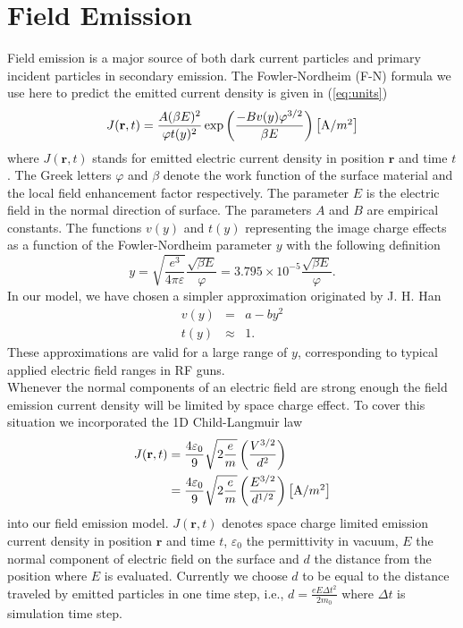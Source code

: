 \chapter{Field Emission}
\label{chp:femiss}
Field emission is a major source of both dark current particles and primary
incident particles in secondary emission. The Fowler-Nordheim (F-N) formula
we use here to predict the emitted current density is given in (\ref{eq:units})
\cite{BC} \cite{FN}
%
\begin{equation}\label{eq:units}
    J(\mathbf{r},t) = \frac{A(\beta E)^2}{\varphi t(y)^2}
                      \exp{\left(\frac{-B v(y)\varphi^{3/2}}{\beta E}\right)}
                      \left[\hbox{A/$m^2$}\right]
\end{equation}
%
where $J(\mathbf{r},t)$ stands for emitted electric current density in position
$\mathbf{r}$ and time $t$. The Greek letters $\varphi$ and $\beta$ denote the
work function of the surface material and the local field enhancement factor
respectively. The parameter $E$ is the electric field in the normal direction
of surface. The parameters $A$ and $B$ are empirical constants. The functions
$v(y)$ and $t(y)$ representing the image charge effects \cite{BC} as a function
of the Fowler-Nordheim parameter $y$ with the following definition\cite{DE}
%
\begin{equation}\label{eq:imagecharge}
    y = \sqrt{\frac{e^3}{4\pi\varepsilon}}\frac{\sqrt{\beta E}}{\varphi} 
      = 3.795\times10^{-5}\frac{\sqrt{\beta E}}{\varphi} \text{.}
\end{equation}
%
In our model, we have chosen a simpler approximation originated by J. H. Han\cite{DE}
\begin{eqnarray*}
v(y) &=& a-by^2 \\
t(y) &\approx& 1 \text{.}
\end{eqnarray*}
These approximations are valid for a large range of $y$, corresponding to
typical applied electric field ranges in RF guns.\\

Whenever the normal components of an electric field are strong enough the field
emission current density will be limited by space charge effect\cite{BC}. 
To cover this situation we incorporated the 1D Child-Langmuir law
%
\begin{align}\label{eq:SpaceCharge}
    J(\mathbf{r},t) & =\frac{4\varepsilon_0}{9}\sqrt{2\frac{e}{m}}\left(\frac{V^{3/2}}{d^2}\right)\notag\\
    &
    =\frac{4\varepsilon_0}{9}\sqrt{2\frac{e}{m}}\left(\frac{E^{3/2}}{d^{1/2}}\right)
    \left[\hbox{A/$m^2$}\right]
\end{align}
%
into our field emission model. $J(\mathbf{r},t)$ denotes space charge limited emission 
current density in position $\mathbf{r}$ and time $t$, $\varepsilon_0$ the
permittivity in vacuum, $E$ the normal component of electric field on the surface
and $d$ the distance from the position where $E$ is evaluated. Currently we 
choose $d$ to be equal to the distance traveled by emitted particles in one
time step, i.e., $d=\frac{\displaystyle eE\Delta{t}^2}{\displaystyle 2m_0}$ where $\Delta{t}$ is simulation
time step.

